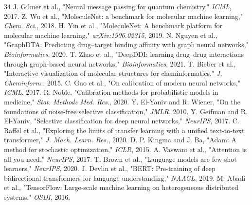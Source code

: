 \documentclass[conference]{IEEEtran}
\begin{document}
\begin{thebibliography}{34}
J. Gilmer et al., "Neural message passing for quantum chemistry," \emph{ICML}, 2017.
Z. Wu et al., "MoleculeNet: a benchmark for molecular machine learning," \emph{Chem. Sci.}, 2018.
H. Yin et al., "MoleculeNet: A benchmark platform for molecular machine learning," \emph{arXiv:1906.02315}, 2019.
N. Nguyen et al., "GraphDTA: Predicting drug--target binding affinity with graph neural networks," \emph{Bioinformatics}, 2020.
T. Zhao et al., "DeepDDI: learning drug--drug interactions through graph-based neural networks," \emph{Bioinformatics}, 2021.
T. Bieber et al., "Interactive visualization of molecular structures for cheminformatics," \emph{J. Cheminform.}, 2015.
C. Guo et al., "On calibration of modern neural networks," \emph{ICML}, 2017.
R. Noble, "Calibration methods for probabilistic models in medicine," \emph{Stat. Methods Med. Res.}, 2020.
Y. El-Yaniv and R. Wiener, "On the foundations of noise-free selective classification," \emph{JMLR}, 2010.
Y. Geifman and R. El-Yaniv, "Selective classification for deep neural networks," \emph{NeurIPS}, 2017.
C. Raffel et al., "Exploring the limits of transfer learning with a unified text-to-text transformer," \emph{J. Mach. Learn. Res.}, 2020.
D. P. Kingma and J. Ba, "Adam: A method for stochastic optimization," \emph{ICLR}, 2015.
A. Vaswani et al., "Attention is all you need," \emph{NeurIPS}, 2017.
T. Brown et al., "Language models are few-shot learners," \emph{NeurIPS}, 2020.
J. Devlin et al., "BERT: Pre-training of deep bidirectional transformers for language understanding," \emph{NAACL}, 2019.
M. Abadi et al., "TensorFlow: Large-scale machine learning on heterogeneous distributed systems," \emph{OSDI}, 2016.
\end{thebibliography}
\end{document}

